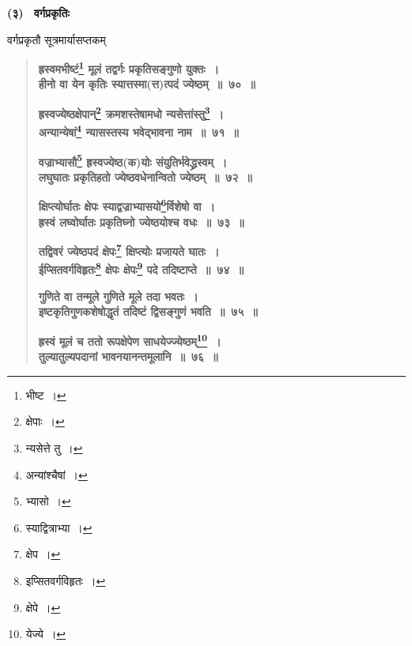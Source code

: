 \documentclass[11pt, openany]{book}
\begin{document}
\newpage

 \label{varga}
\begin{center}
\textbf{(३) ~वर्गप्रकृतिः}
\end{center}
\vspace{2mm}

वर्गप्रकृतौ सूत्रमार्यासप्तकम् \textendash 

 \label{70}
\begin{quote}
\textbf{{\color{purple}ह्रस्वमभीष्टं\renewcommand{\thefootnote}{१}\footnote{भीष्ट~।} मूलं तद्वर्गः प्रकृतिसङ्गुणो युक्तः~। \\
हीनो वा येन कृतिः स्यात्तस्मा(त्त)त्पदं ज्येष्ठम्~॥~७०~॥}}
\vspace{1mm}

\textbf{{\color{purple}ह्रस्वज्येष्ठक्षेपान्\renewcommand{\thefootnote}{२}\footnote{क्षेपाः~।} क्रमशस्तेषामधो न्यसेत्तांस्तु\renewcommand{\thefootnote}{३}\footnote{न्यसेत्ते तु~।}~। \\
अन्यान्येषां\renewcommand{\thefootnote}{४}\footnote{अन्यांश्चैषां~।} न्यासस्तस्य भवेद्भावना नाम~॥~७१~॥}}
\vspace{1mm}

 \label{72}
\textbf{{\color{purple}वज्राभ्यासौ\renewcommand{\thefootnote}{५}\footnote{भ्यासो~।} ह्रस्वज्येष्ठ(क)योः संयुतिर्भवेद्ध्रस्वम्~। \\
लघुघातः प्रकृतिहतो ज्येष्ठवधेनान्वितो ज्येष्ठम्~॥~७२~॥}}
\vspace{1mm}

 \label{73}
\textbf{{\color{purple}क्षिप्त्योर्घातः क्षेपः स्याद्वज्राभ्यासयो\renewcommand{\thefootnote}{६}\footnote{स्याद्वित्राभ्या~।}र्विशेषो वा~। \\
ह्रस्वं लघ्वोर्घातः प्रकृतिघ्नो ज्येष्ठयोश्च वधः~॥~७३~॥}}
\vspace{1mm}

 \label{74}
\textbf{{\color{purple}तद्विवरं ज्येष्ठपदं क्षेपः\renewcommand{\thefootnote}{७}\footnote{क्षेप~।} क्षिप्त्योः प्रजायते घातः~। \\
ईप्सितवर्गविहृतः\renewcommand{\thefootnote}{८}\footnote{इप्सितवर्गविहृतः~।} क्षेपः क्षेपः\renewcommand{\thefootnote}{९}\footnote{क्षेपे~।} पदे तदिष्टाप्ते~॥~७४~॥}}
\vspace{1mm}

 \label{75}
\textbf{{\color{purple}गुणिते वा तन्मूले गुणिते मूले तदा भवतः~। \\
इष्टकृतिगुणकशेषोद्धृतं तदिष्टं द्विसङ्गुणं भवति~॥~७५~॥}}
\vspace{1mm}

 \label{76}
\textbf{{\color{purple}ह्रस्वं मूलं च ततो रूपक्षेपेण साधयेज्ज्येष्ठम्\renewcommand{\thefootnote}{१०}\footnote{येज्ये~।}~। \\
तुल्यातुल्यपदानां भावनयानन्तमूलानि~॥~७६~॥}}
\end{quote}
\vspace{2mm}
\end{document}
